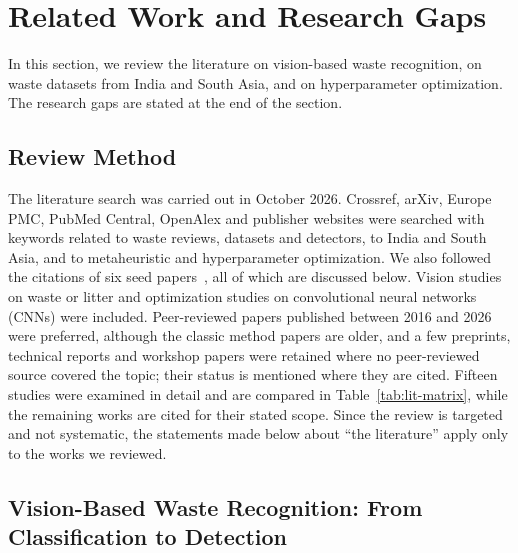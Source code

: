 \section{Related Work and Research Gaps}
\label{sec:related}

In this section, we review the literature on vision-based waste recognition, on waste datasets from India and South Asia, and on hyperparameter optimization. The research gaps are stated at the end of the section.

\subsection{Review Method}
\label{subsec:review-method}

The literature search was carried out in October 2026. Crossref, arXiv, Europe PMC, PubMed Central, OpenAlex and publisher websites were searched with keywords related to waste reviews, datasets and detectors, to India and South Asia, and to metaheuristic and hyperparameter optimization. We also followed the citations of six seed papers~\cite{majchrowska2022deep,yang2016classification,kaya2023classification,sayed2024intelligent,aguerchi2024cnn,alshammari2025smart}, all of which are discussed below. Vision studies on waste or litter and optimization studies on convolutional neural networks (CNNs) were included. Peer-reviewed papers published between 2016 and 2026 were preferred, although the classic method papers are older, and a few preprints, technical reports and workshop papers were retained where no peer-reviewed source covered the topic; their status is mentioned where they are cited. Fifteen studies were examined in detail and are compared in Table~\ref{tab:lit-matrix}, while the remaining works are cited for their stated scope. Since the review is targeted and not systematic, the statements made below about ``the literature'' apply only to the works we reviewed.

\subsection{Vision-Based Waste Recognition: From Classification to Detection}
\label{subsec:rw-waste}

